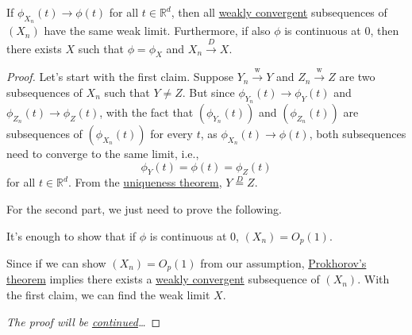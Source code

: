\begin{theorem}\label{thm:characteristic-function-weak-convergence}
	If \(\phi _{X_n}(t) \to \phi (t)\) for all \(t \in \mathbb{R} ^d\), then all \hyperref[def:converge-weakly]{weakly convergent} subsequences of \((X_n)\) have the same weak limit. Furthermore, if also \(\phi \) is continuous at \(0\), then there exists \(X\) such that \(\phi = \phi _X\)  and \(X_n \overset{D}{\to } X\).
\end{theorem}
\begin{proof}\let\qed\relax
	Let's start with the first claim. Suppose \(Y_n \overset{\text{w} }{\to } Y\) and \(Z_n \overset{\text{w} }{\to } Z\) are two subsequences of \(X_n\) such that \(Y \neq Z\). But since \(\phi _{Y_n}(t) \to \phi _Y(t)\) and \(\phi _{Z_n}(t) \to \phi _Z(t)\), with the fact that \((\phi _{Y_n}(t))\) and \((\phi _{Z_n}(t))\) are subsequences of \((\phi _{X_n}(t))\) for every \(t\), as \(\phi _{X_n}(t) \to \phi (t)\), both subsequences need to converge to the same limit, i.e.,
	\[
		\phi _Y(t) = \phi (t) = \phi _Z(t)
	\]
	for all \(t \in \mathbb{R} ^d\). From the \hyperref[thm:characteristic-function-uniqueness]{uniqueness theorem}, \(Y \overset{D}{=} Z\).

	For the second part, we just need to prove the following.
	\begin{claim}
		It's enough to show that if \(\phi \) is continuous at \(0\), \((X_n) = O_p(1)\).
	\end{claim}
	\begin{explanation}
		Since if we can show \((X_n) = O_p(1)\) from our assumption, \hyperref[thm:Prokhorov]{Prokhorov's theorem} implies there exists a \hyperref[def:converge-weakly]{weakly convergent} subsequence of \((X_n)\). With the first claim, we can find the weak limit \(X\).
	\end{explanation}
	\emph{The proof will be \hyperref[pf:thm:characteristic-function-weak-convergence]{continued}\dots}
\end{proof}